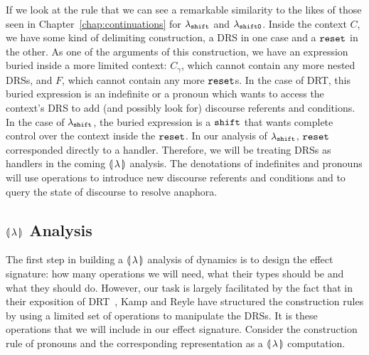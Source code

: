 If we look at the rule that we can see a remarkable similarity to the likes
of those seen in Chapter~\ref{chap:continuations} for $\lambda_{\mathtt{shift}}$ and
$\lambda_{\mathtt{shift0}}$. Inside the context $C$, we have some kind of delimiting
construction, a DRS in one case and a $\mathtt{reset}$ in the other. As one of the
arguments of this construction, we have an expression buried inside a more
limited context: $C_\gamma$, which cannot contain any more nested DRSs, and
$F$, which cannot contain any more $\mathtt{reset}$s. In the case of DRT, this
buried expression is an indefinite or a pronoun which wants to access the
context's DRS to add (and possibly look for) discourse referents and
conditions. In the case of $\lambda_{\mathtt{shift}}$, the buried expression is a
$\mathtt{shift}$ that wants complete control over the context inside the
$\mathtt{reset}$. In our analysis of $\lambda_{\mathtt{shift}}$, $\mathtt{reset}$ corresponded
directly to a handler. Therefore, we will be treating DRSs as handlers in
the coming $\llparenthesis \, \lambda \, \rrparenthesis$ analysis. The denotations of indefinites and
pronouns will use operations to introduce new discourse referents and
conditions and to query the state of discourse to resolve anaphora.


\subsection{\texorpdfstring{$\llparenthesis \, \lambda \, \rrparenthesis$ Analysis}{Analysis in Our Calculus}}
\label{ssec:banana-drt}

The first step in building a $\llparenthesis \, \lambda \, \rrparenthesis$ analysis of dynamics is to
design the effect signature: how many operations we will need, what their
types should be and what they should do. However, our task is largely
facilitated by the fact that in their exposition of
DRT~\cite{kamp1993discourse}, Kamp and Reyle have structured the
construction rules by using a limited set of operations to manipulate the
DRSs. It is these operations that we will include in our effect
signature. Consider the construction rule of pronouns and the corresponding
representation as a $\llparenthesis \, \lambda \, \rrparenthesis$ computation.

\vspace{3mm}

